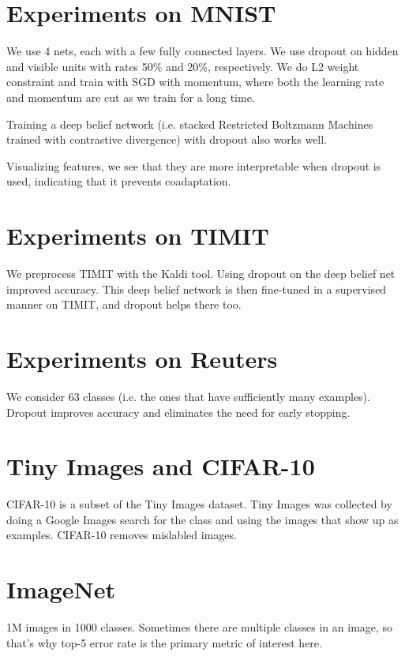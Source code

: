 \documentclass[a4paper]{article}
\begin{document}
\section{Experiments on MNIST}
We use 4 nets, each with a few fully connected layers. We use dropout on hidden
and visible units with rates 50\% and 20\%, respectively. We do L2 weight
constraint and train with SGD with momentum, where both the learning rate
and momentum are cut as we train for a long time.

Training a deep belief network (i.e. stacked Restricted Boltzmann Machines
trained with contrastive divergence) with dropout also works well.

Visualizing features, we see that they are more interpretable when dropout is
used, indicating that it prevents coadaptation.

\section{Experiments on TIMIT}
We preprocess TIMIT with the Kaldi tool. Using dropout on the deep belief net
improved accuracy. This deep belief network is then fine-tuned in a supervised
manner on TIMIT, and dropout helps there too.

\section{Experiments on Reuters}
We consider 63 classes (i.e. the ones that have sufficiently many examples).
Dropout improves accuracy and eliminates the need for early stopping.

\section{Tiny Images and CIFAR-10}
CIFAR-10 is a subset of the Tiny Images dataset. Tiny Images was collected by
doing a Google Images search for the class and using the images that show up
as examples. CIFAR-10 removes mislabled images.

\section{ImageNet}
1M images in 1000 classes. Sometimes there are multiple classes in an image,
so that's why top-5 error rate is the primary metric of interest here.
\end{document}
